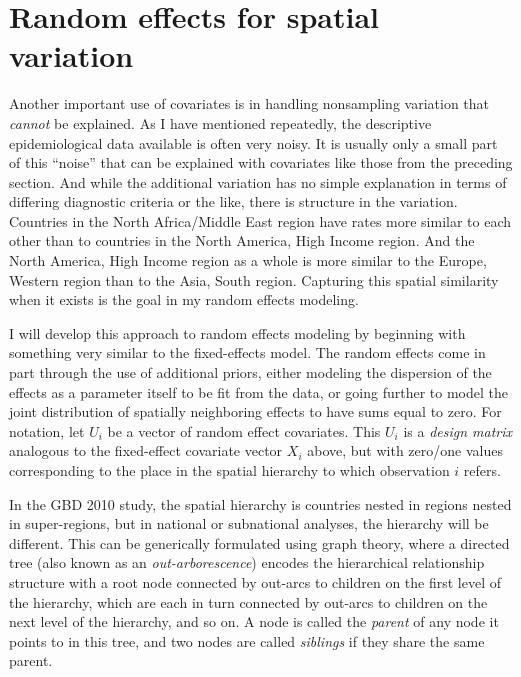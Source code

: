 \section{Random effects for spatial variation}
Another important use of covariates is in handling nonsampling
variation that \emph{cannot} be explained. As I have mentioned
repeatedly, the descriptive epidemiological data available is often
very noisy.  It is usually only a small part of this ``noise'' that
can be explained with covariates like those from the preceding
section. And while the additional variation has no simple explanation
in terms of differing diagnostic criteria or the like, there is
structure in the variation. Countries in the North Africa/Middle East
region have rates more similar to each other than to countries in the
North America, High Income region.  And the North America, High Income
region as a whole is more similar to the Europe, Western region than
to the Asia, South region.  Capturing this spatial similarity when it
exists is the goal in my random effects modeling.

I will develop this approach to random effects modeling by beginning
with something very similar to the fixed-effects model.  The random
effects come in part through the use of additional priors, either
modeling the dispersion of the effects as a parameter itself to be
fit from the data, or going further to model the joint distribution of
spatially neighboring effects to have sums equal to zero.  For
notation, let $U_i$ be a vector of random effect covariates.  This
$U_i$ is a \emph{design matrix} analogous to the fixed-effect
covariate vector $X_i$ above, but with zero/one values corresponding
to the place in the spatial hierarchy to which observation $i$ refers.

In the GBD 2010 study, the spatial hierarchy is countries nested in regions
nested in super-regions, but in national or subnational analyses, the
hierarchy will be different. This can be generically formulated using
graph theory, where a directed tree (also known as an
\emph{out-arborescence}) encodes the hierarchical relationship
structure with a root node connected by out-arcs to children on the
first level of the hierarchy, which are each in turn connected by
out-arcs to children on the next level of the hierarchy, and so on.  A
node is called the \emph{parent} of any node it points to in this
tree, and two nodes are called \emph{siblings} if they share the same
parent.


